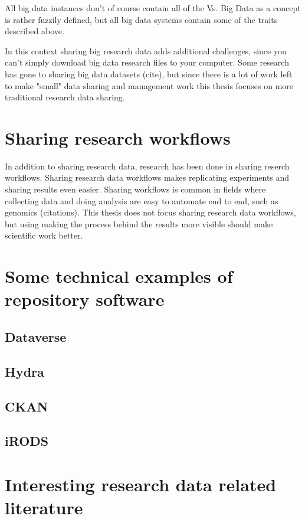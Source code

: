 All big data instances don't of course contain all of the Vs. Big Data as a
concept is rather fuzzily defined, but all big data systems contain some of the
traits described above.

In this context sharing big research data adds additional challenges, since 
you can't simply download big data research files to your computer. Some
research has gone to sharing big data datasets (cite), but since there is a lot
of work left to make "small" data sharing and management work this thesis
focuses on more traditional research data sharing.

\section{Sharing research workflows}

In addition to sharing research data, research has been done in sharing
reserch workflows. Sharing research data workflows makes replicating
experiments and sharing results even easier. Sharing workflows is common in
fields where collecting data and doing analysis are easy to automate end to
end, such as genomics (citations). This thesis does not focus sharing research
data workflows, but using making the process behind the results more visible
should make scientific work better. 

\section{Some technical examples of repository software}

\subsection{Dataverse}

\subsection{Hydra}

\subsection{CKAN}

\subsection{iRODS}

\section{Interesting research data related literature}

